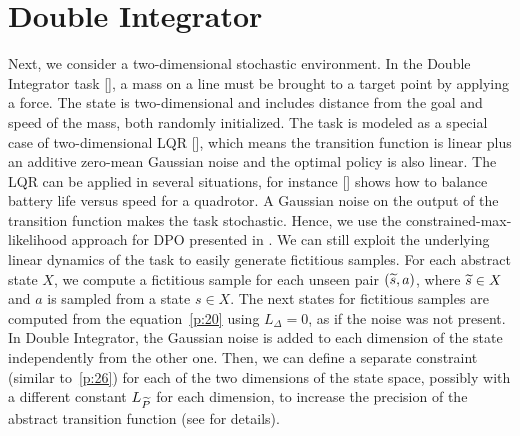 \section{Double Integrator} \label{sec:mass}
Next, we consider a two-dimensional stochastic environment. In the Double Integrator task [\cite{recht2018tour}], a mass on a line must be brought to a target point by applying a force. The state is two-dimensional and includes distance from the goal and speed of the mass, both randomly initialized. The task is modeled as a special case of two-dimensional \acf{LQR} [\cite{peters2002policy}], which means the transition function is linear plus an additive zero-mean Gaussian noise and the optimal policy is also linear. The \ac{LQR} can be applied in several situations, for instance [\cite{recht2018tour}] shows how to balance battery life versus speed for a quadrotor. A Gaussian noise on the output of the transition function makes the task stochastic. Hence, we use the constrained-max-likelihood approach for \ac{DPO} presented in . We can still exploit the underlying linear dynamics of the task to easily generate fictitious samples. For each abstract state $X$, we compute a fictitious sample for each unseen pair $(\widetilde{s}, a)$, where $\widetilde{s} \in X$ and $a$ is sampled from a state $s \in X$. The next states for fictitious samples are computed from the equation~\eqref{p:20} using $L_{\Delta}=0$, as if the noise was not present. In Double Integrator, the Gaussian noise is added to each dimension of the state independently from the other one. Then, we can define a separate constraint (similar to~\eqref{p:26}) for each of the two dimensions of the state space, possibly with a different constant $L_{\widetilde{P}}$ for each dimension, to increase the precision of the abstract transition function (see  for details).

